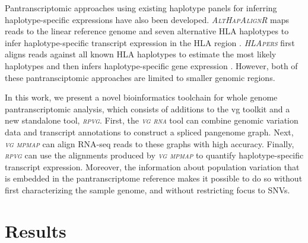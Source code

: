 \documentclass[11pt]{ucthesis}
\newcommand{\tool}[1]{\emph{\textsc{#1}}}
\begin{document}
Pantranscriptomic approaches using existing haplotype panels for inferring haplotype-specific expressions have also been developed. \tool{AltHapAlignR} maps reads to the linear reference genome and seven alternative HLA haplotypes to infer haplotype-specific transcript expression in the HLA region \cite{lee2018althapalignr}. \tool{HLApers} first aligns reads against all known HLA haplotypes to estimate the most likely haplotypes and then infers haplotype-specific gene expression \cite{Aguiar2019-fy}. However, both of these pantransciptomic approaches are limited to smaller genomic regions. 

In this work, we present a novel bioinformatics toolchain for whole genome pantranscriptomic analysis, which consists of additions to the vg toolkit and a new standalone tool, \tool{rpvg}. First, the \tool{vg rna} tool can combine genomic variation data and transcript annotations to construct a spliced pangenome graph. Next, \tool{vg mpmap} can align RNA-seq reads to these graphs with high accuracy. Finally, \tool{rpvg} can use the alignments produced by \tool{vg mpmap} to quantify haplotype-specific transcript expression. Moreover, the information about population variation that is embedded in the pantranscriptome reference makes it possible to do so without first characterizing the sample genome, and without restricting focus to SNVs.

\section{Results}
\end{document}
